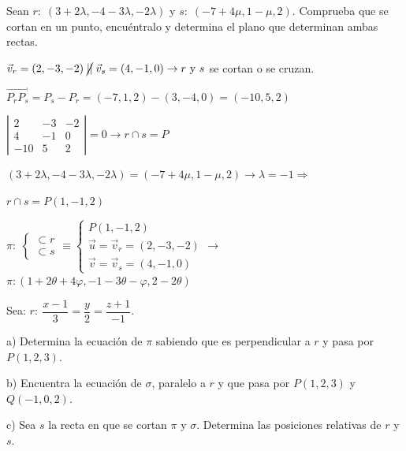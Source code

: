 \begin{ejre}
	Sean $r:\;(3+2\lambda, -4-3\lambda, -2\lambda)$ y $s:\; (-7+4\mu, 1-\mu, 2)$. Comprueba que se cortan en un punto, encuéntralo y determina el plano que determinan ambas rectas.
\end{ejre}

\begin{proofw}\renewcommand{\qedsymbol}{$\diamond$}
	$\vec v_r=(2,-3,-2) \;\cancel{||}\; \vec v_s=(4,-1,0) \to r \text{ y } s$ se cortan o se cruzan.
	
	\noindent $\overrightarrow{ P_rP_s }=P_s-P_r=(-7,1,2)-(3,-4,0)=(-10,5,2)$
	
	\noindent $\left| \begin{matrix} 2&-3&-2\\4&-1&0\\-10&5&2 \end{matrix} \right|=0 \to r\cap s=P$
	
	\noindent $(3+2\lambda, -4-3\lambda, \boxed{-2\lambda})= (-7+4\mu, 1-\mu, \boxed{2}) \to \lambda =-1 \Rightarrow$
	
	\noindent $ r\cap s=P(1, -1, 2)$
	
	\noindent \small{$\pi:\; \begin{cases} \subset r \\ \subset s \end{cases} \equiv \begin{cases} P(1,-1,2) \\ \vec u=\vec v_r=(2,-3,-2) \\ \vec v=\vec v_s=(4,-1,0) \end{cases} \to$}\normalsize{$ \pi:(1+2\theta+4\varphi,-1-3\theta-\varphi,2-2\theta)$}
	
	\end{proofw}


\begin{ejre}
	Sea: $r:\:  \dfrac{x-1}{3}=\dfrac{y}{2}=\dfrac{z+1}{-1}$.
	
	a) Determina la ecuación de $\pi$ sabiendo que es perpendicular a $r$ y pasa por $P(1,2,3)$.
	
	b) Encuentra la ecuación de $\sigma$, paralelo a $r$ y que pasa por $P(1,2,3)$ y $Q(-1,0,2)$.
	
	c) Sea $s$ la recta en que se cortan $\pi$ y $\sigma$. Determina las posiciones relativas de $r$ y $s$.
\end{ejre}

